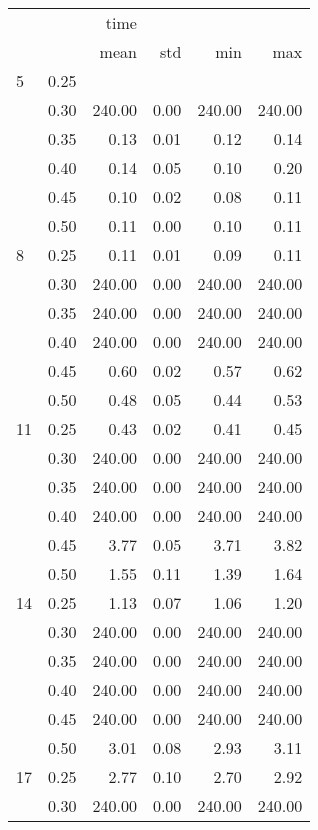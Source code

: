 \documentclass[11pt]{article}
\begin{document}
\begin{table}
  \centering
  \begin{tabular}{llrrrr}
    \toprule
    &      &   time &      &        &        \\
    &      &   mean &  std &    min &    max \\
    \midrule
    5  & 0.25 &        &      &        &        \\
    & 0.30 & 240.00 & 0.00 & 240.00 & 240.00 \\
    & 0.35 &   0.13 & 0.01 &   0.12 &   0.14 \\
    & 0.40 &   0.14 & 0.05 &   0.10 &   0.20 \\
    & 0.45 &   0.10 & 0.02 &   0.08 &   0.11 \\
    & 0.50 &   0.11 & 0.00 &   0.10 &   0.11 \\
    \hline
    8  & 0.25 &   0.11 & 0.01 &   0.09 &   0.11 \\
    & 0.30 & 240.00 & 0.00 & 240.00 & 240.00 \\
    & 0.35 & 240.00 & 0.00 & 240.00 & 240.00 \\
    & 0.40 & 240.00 & 0.00 & 240.00 & 240.00 \\
    & 0.45 &   0.60 & 0.02 &   0.57 &   0.62 \\
    & 0.50 &   0.48 & 0.05 &   0.44 &   0.53 \\
    \hline
    11 & 0.25 &   0.43 & 0.02 &   0.41 &   0.45 \\
    & 0.30 & 240.00 & 0.00 & 240.00 & 240.00 \\
    & 0.35 & 240.00 & 0.00 & 240.00 & 240.00 \\
    & 0.40 & 240.00 & 0.00 & 240.00 & 240.00 \\
    & 0.45 &   3.77 & 0.05 &   3.71 &   3.82 \\
    & 0.50 &   1.55 & 0.11 &   1.39 &   1.64 \\
    \hline
    14 & 0.25 &   1.13 & 0.07 &   1.06 &   1.20 \\
    & 0.30 & 240.00 & 0.00 & 240.00 & 240.00 \\
    & 0.35 & 240.00 & 0.00 & 240.00 & 240.00 \\
    & 0.40 & 240.00 & 0.00 & 240.00 & 240.00 \\
    & 0.45 & 240.00 & 0.00 & 240.00 & 240.00 \\
    & 0.50 &   3.01 & 0.08 &   2.93 &   3.11 \\
    17 & 0.25 &   2.77 & 0.10 &   2.70 &   2.92 \\
    \hline
    & 0.30 & 240.00 & 0.00 & 240.00 & 240.00 \\

\end{tabular}
\end{table}
\end{document}
